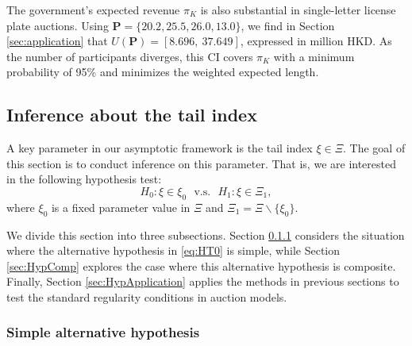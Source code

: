 \begin{runningexamplecont}
    The government's expected revenue $\pi_K$ is also substantial in single-letter license plate auctions. Using $\mathbf{P}=\{20.2, 25.5, 26.0, 13.0\}$, we find in Section \ref{sec:application} that $U(\mathbf{P})=[8.696,~37.649]$, expressed in million HKD. As the number of participants diverges, this CI covers $\pi_K$ with a minimum probability of 95\% and minimizes the weighted expected length.
\end{runningexamplecont}

\subsection{Inference about the tail index}\label{sec:sp-index}

A key parameter in our asymptotic framework is the tail index $\xi \in \Xi$.
The goal of this section is to conduct inference on this parameter. That is, we are interested in the following hypothesis test:
\begin{equation}
H_{0}:\xi \in \xi _{0}~~~\text{v.s.}~~~H_{1}:\xi \in \Xi _{1},
\label{eq:HT0}
\end{equation}
where $\xi _{0}$ is a fixed parameter value in $\Xi $ and $\Xi _{1}=\Xi \backslash \{ \xi _{0}\}$.

We divide this section into three subsections. Section \ref{sec:HypSimple} considers the situation where the alternative hypothesis in \eqref{eq:HT0} is simple, while Section \ref{sec:HypComp} explores the case where this alternative hypothesis is composite. Finally, Section \ref{sec:HypApplication} applies the methods in previous sections to test the standard regularity conditions in auction models. 

\subsubsection{Simple alternative hypothesis}\label{sec:HypSimple}

